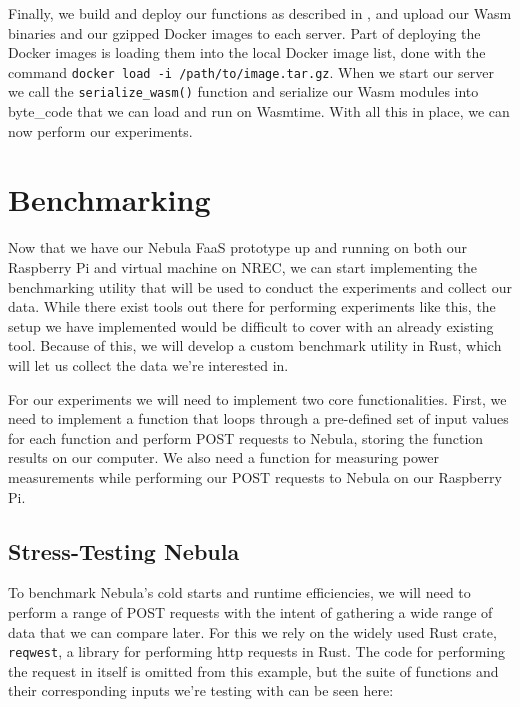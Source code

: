 \documentclass[
  table]{report}
\begin{document}
Finally, we build and deploy our functions as described in
, and upload our \ac{Wasm} binaries and our
gzipped Docker images to each server. Part of deploying the Docker
images is loading them into the local Docker image list, done with the
command \texttt{docker\ load\ -i\ /path/to/image.tar.gz}. When we start
our server we call the \texttt{serialize\_wasm()} function and serialize
our \ac{Wasm} modules into byte\_code that we can load and run on
Wasmtime. With all this in place, we can now perform our experiments.

\section{Benchmarking}
\label{sect:impl_bench}

Now that we have our Nebula \ac{FaaS} prototype up and running on both
our Raspberry Pi and virtual machine on \ac{NREC}, we can start
implementing the benchmarking utility that will be used to conduct the
experiments and collect our data. While there exist tools out there for
performing experiments like this, the setup we have implemented would be
difficult to cover with an already existing tool. Because of this, we
will develop a custom benchmark utility in Rust, which will let us
collect the data we're interested in.

For our experiments we will need to implement two core functionalities.
First, we need to implement a function that loops through a pre-defined
set of input values for each function and perform POST requests to
Nebula, storing the function results on our computer. We also need a
function for measuring power measurements while performing our POST
requests to Nebula on our Raspberry Pi.

\subsection{Stress-Testing Nebula}

To benchmark Nebula's cold starts and runtime efficiencies, we will need
to perform a range of POST requests with the intent of gathering a wide
range of data that we can compare later. For this we rely on the widely
used Rust crate, \texttt{reqwest}, a library for performing http
requests in Rust. The code for performing the request in itself is
omitted from this example, but the suite of functions and their
corresponding inputs we're testing with can be seen here:

\newpage
\end{document}
